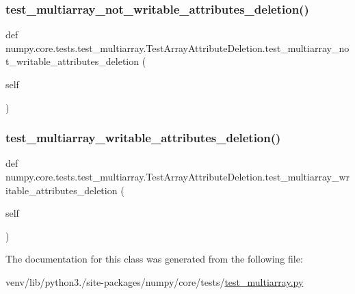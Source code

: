 \subsubsection{\texorpdfstring{test\+\_\+multiarray\+\_\+not\+\_\+writable\+\_\+attributes\+\_\+deletion()}{test\_multiarray\_not\_writable\_attributes\_deletion()}}
{\footnotesize\ttfamily def numpy.\+core.\+tests.\+test\+\_\+multiarray.\+Test\+Array\+Attribute\+Deletion.\+test\+\_\+multiarray\+\_\+not\+\_\+writable\+\_\+attributes\+\_\+deletion (\begin{DoxyParamCaption}\item[{}]{self }\end{DoxyParamCaption})}

\mbox{\label{classnumpy_1_1core_1_1tests_1_1test__multiarray_1_1TestArrayAttributeDeletion_a99533ddbb3d74d1ffaf33d17c345bb7c}} 
\subsubsection{\texorpdfstring{test\+\_\+multiarray\+\_\+writable\+\_\+attributes\+\_\+deletion()}{test\_multiarray\_writable\_attributes\_deletion()}}
{\footnotesize\ttfamily def numpy.\+core.\+tests.\+test\+\_\+multiarray.\+Test\+Array\+Attribute\+Deletion.\+test\+\_\+multiarray\+\_\+writable\+\_\+attributes\+\_\+deletion (\begin{DoxyParamCaption}\item[{}]{self }\end{DoxyParamCaption})}



The documentation for this class was generated from the following file\+:\begin{DoxyCompactItemize}
\item 
venv/lib/python3./site-\/packages/numpy/core/tests/\hyperlink{core_2tests_2test__multiarray_8py}{test\+\_\+multiarray.\+py}\end{DoxyCompactItemize}
